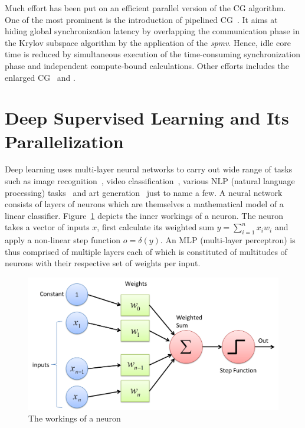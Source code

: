 Much effort has been put on an efficient parallel version of the CG
algorithm. One of the most prominent is the introduction of pipelined
CG~\cite{ghysels14}. It aims at hiding global synchronization latency by
overlapping the communication phase in the Krylov subspace algorithm by the
application of the \textit{spmv}. Hence, idle core time is reduced by
simultaneous execution of the time-consuming synchronization phase and
independent compute-bound calculations. Other efforts includes the 
enlarged CG~\cite{enlarged} and \cite{cg1, cg2}.

\section{Deep Supervised Learning and Its Parallelization}
\label{sec:dnn}
Deep learning uses multi-layer neural networks to carry out wide range of tasks 
such as image recognition~\cite{alexnet},  video 
classification~\cite{video_class}, various NLP (natural language processing) 
tasks~\cite{nlp0, nlp1, nlp2, nlp3} and art generation~\cite{gan, can} just to 
name a few. A neural network consists of layers of neurons which are themselves 
a mathematical model of a linear classifier. Figure~\ref{fig:perceptron} depicts 
the inner workings of a neuron. The neuron takes a vector of inputs $x$, first 
calculate its weighted sum $y = \sum_{i=1}^{n} x_i w_i$ and apply a non-linear 
step function $o = \delta(y)$. An MLP (multi-layer perceptron) is thus comprised 
of multiple layers each of which is constituted of multitudes of neurons with 
their respective set of weights per input.
\begin{figure}[H]
    \centerline{\includegraphics[scale=0.25]{background/figs/perceptron.png}}
    \caption{The workings of a neuron}
    \label{fig:perceptron}
\end{figure}

